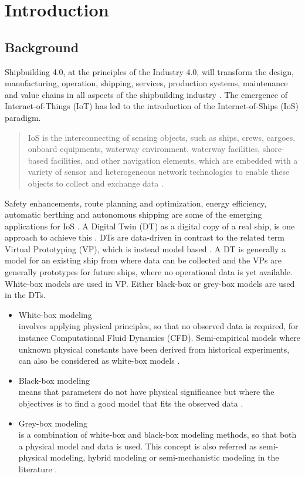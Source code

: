 \chapter{Introduction}
\section{Background}
Shipbuilding 4.0, at the principles of the Industry 4.0, will transform the design, manufacturing, operation, shipping, services, production systems, maintenance and value chains in all aspects of the shipbuilding 
industry \cite{stanic_toward_2018}.
The emergence of Internet-of-Things (IoT) has led to the introduction of the Internet-of-Ships (IoS) paradigm. \begin{quote} IoS is the interconnecting of sensing objects, such as ships, crews, cargoes, onboard equipments, waterway environment, waterway facilities, shore-based facilities, and other navigation elements, which are embedded with a variety of sensor and heterogeneous network technologies to enable these objects to collect and exchange data \cite{liu_internet_2016-1}.\end{quote}
Safety enhancements, route planning and optimization, energy efficiency, automatic berthing and autonomous shipping are some of the emerging applications for IoS \cite{aslam_internet_2020}.
A Digital Twin (DT) as a digital copy of a real ship, is one approach to achieve this \cite{chen_review_2021}. 
DTs are data-driven in contrast to the related term Virtual Prototyping (VP), which is instead model based \cite{major_framework_2021}. A DT is generally a model for an existing ship from where data can be collected and the VPs are generally prototypes for future ships, where no operational data is yet available.
White-box models are used in VP. Either black-box or grey-box models are used in the DTs. 

\begin{itemize}
    \item White-box modeling \\
    involves applying physical principles, so that no observed data is required, for instance Computational Fluid Dynamics (CFD). Semi-empirical models where unknown physical constants have been derived from historical experiments, can also be considered as white-box models \cite{leifsson_grey-box_2008}.  

    \item Black-box modeling \\
    means that parameters do not have physical significance but where the objectives is to find a good model that fits the observed data \cite{lindskog_tools_1995}.
    
    \item Grey-box modeling \\
    is a combination of white-box and black-box modeling methods, so that both a physical model and data is used. This concept is also referred as semi-physical modeling, hybrid modeling or semi-mechanistic modeling in the literature \cite{leifsson_grey-box_2008}. 
\end{itemize}

